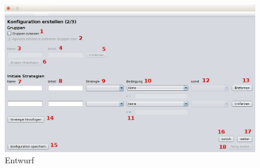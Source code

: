 \begin{figure}[hp] 
  \centering
     \includegraphics[width=1.2\textwidth]{GUI_Entwurf/WizardFenster2.png}
  \caption{Entwurf}
  \label{fig:Bild1}
\end{figure}

